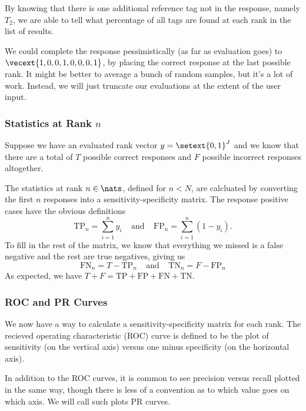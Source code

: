 By knowing that there is one additional reference tag not in the
response, namely $T_2$, we are able to tell what percentage of all
tags are found at each rank in the list of results.

We could complete the response pessimistically (as far as evaluation
goes) to $\vecext{1,0,0,1,0,0,0,1}$, by placing the correct response
at the last possible rank.  It might be better to average a bunch of
random samples, but it's a lot of work.  Instead, we will just
truncate our evaluations at the extent of the user input.

\subsubsection{Statistics at Rank $n$}

Suppose we have an evaluated rank vector $y = \setext{0,1}^J$
and we know that there are a total of $T$ possible correct
responses and $F$ possible incorrect responses altogether.

The statistics at rank $n \in \nats$, defined for $n < N$, are
calcluated by converting the first $n$ responses into a
sensitivity-specificity matrix.  The response positive cases
have the obvious definitions
%
\begin{equation}
\mbox{TP}_n = \sum_{i=1}^n y_i
\ \ \ \ \ \mbox{and} \ \ \ \ \
\mbox{FP}_n = \sum_{i=1}^n (1-y_i).
\end{equation}
%
To fill in the rest of the matrix, we know that everything we missed
is a false negative and the rest are true negatives, giving us
%
\begin{equation}
\mbox{FN}_n = T - \mbox{TP}_n
\ \ \ \ \ \mbox{and} \ \ \ \ \
\mbox{TN}_n = F - \mbox{FP}_n
\end{equation}
%
As expected, we have $T+F = \mbox{TP} + \mbox{FP} + \mbox{FN} +
\mbox{TN}$.

\subsubsection{ROC and PR Curves}

We now have a way to calculate a sensitivity-specificity matrix for
each rank.  The recieved operating characteristic (ROC) curve is
defined to be the plot of sensitivity (on the vertical axis) versus
one minus specificity (on the horizontal axis).

In addition to the ROC curves, it is common to see precision versus
recall plotted in the same way, though there is less of a convention
as to which value goes on which axis.  We will call such plots PR
curves.

